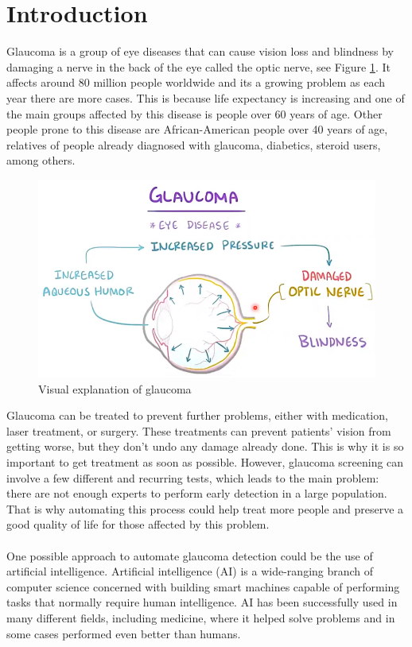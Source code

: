 \documentclass[11pt, a4paper]{article}
\begin{document}
\section{Introduction}
Glaucoma is a group of eye diseases that can cause vision loss and blindness by damaging a nerve in the back of the eye called the optic nerve, see Figure \ref{fig:Glaucoma_explanation_visualized}. It affects around 80 million people worldwide and its a growing problem as each year there are more cases. This is because life expectancy is increasing and one of the main groups affected by this disease is people over 60 years of age. Other people prone to this disease are African-American people over 40 years of age, relatives of people already diagnosed with glaucoma, diabetics, steroid users, among others.
\begin{figure}[H]
	\centering
	\includegraphics[width=14cm]{imgs/general/Glaucoma_explanation_visualized.PNG}
	\caption{Visual explanation of glaucoma}
	 \label{fig:Glaucoma_explanation_visualized}
\end{figure}
\noindent Glaucoma can be treated to prevent further problems, either with medication, laser treatment, or surgery. These treatments can prevent patients' vision from getting worse, but they don't undo any damage already done. This is why it is so important to get treatment as soon as possible. However, glaucoma screening can involve a few different and recurring tests, which leads to the main problem: there are not enough experts to perform early detection in a large population. That is why automating this process could help treat more people and preserve a good quality of life for those affected by this problem.
\\
\\
One possible approach to automate glaucoma detection could be the use of artificial intelligence. Artificial intelligence (AI) is a wide-ranging branch of computer science concerned with building smart machines capable of performing tasks that normally require human intelligence. AI has been successfully used in many different fields, including medicine, where it helped solve problems and in some cases performed even better than humans.
\end{document}
